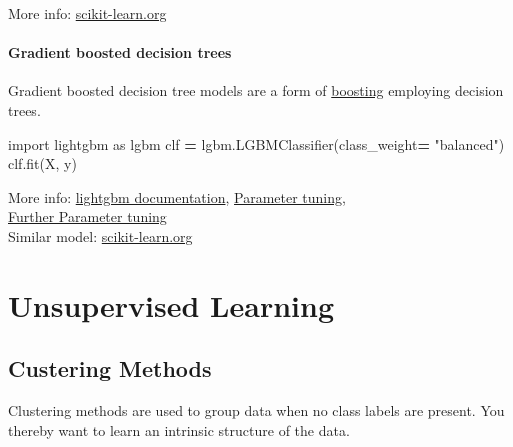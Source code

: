 \documentclass[
]{book}
\newenvironment{Shaded}{\begin{snugshade}}{\end{snugshade}}
\newcommand{\ImportTok}[1]{#1}
\newcommand{\NormalTok}[1]{#1}
\newcommand{\OperatorTok}[1]{\textcolor[rgb]{0.81,0.36,0.00}{\textbf{#1}}}
\newcommand{\StringTok}[1]{\textcolor[rgb]{0.31,0.60,0.02}{#1}}
\begin{document}
More info:
\href{https://scikit-learn.org/stable/modules/generated/sklearn.ensemble.RandomForestClassifier.html}{scikit-learn.org}\\

\hypertarget{gradient-boosted-decision-trees}{%
\subsubsection{Gradient boosted decision trees}\label{gradient-boosted-decision-trees}}

Gradient boosted decision tree models are a form of
\protect\hyperlink{boosting}{boosting} employing decision trees.

\begin{Shaded}
\begin{Highlighting}[]
\ImportTok{import}\NormalTok{ lightgbm }\ImportTok{as}\NormalTok{ lgbm}
\NormalTok{clf }\OperatorTok{=}\NormalTok{ lgbm.LGBMClassifier(class\_weight}\OperatorTok{=} \StringTok{"balanced"}\NormalTok{)}
\NormalTok{clf.fit(X, y)}
\end{Highlighting}
\end{Shaded}

More info: \href{https://lightgbm.readthedocs.io/en/latest/pythonapi/lightgbm.LGBMClassifier.html\#lightgbm-lgbmclassifier}{lightgbm
documentation},
\href{https://lightgbm.readthedocs.io/en/latest/Parameters-Tuning.html}{Parameter
tuning},\\
\href{https://neptune.ai/blog/lightgbm-parameters-guide}{Further Parameter
tuning}\\
Similar model: \href{https://scikit-learn.org/stable/modules/generated/sklearn.ensemble.GradientBoostingClassifier.html}{scikit-learn.org}\\

\hypertarget{unsupervised-learning}{%
\chapter{Unsupervised Learning}\label{unsupervised-learning}}

\hypertarget{custering-methods}{%
\section{Custering Methods}\label{custering-methods}}

Clustering methods are used to group data when no class labels are
present. You thereby want to learn an intrinsic structure of the data.
\end{document}
